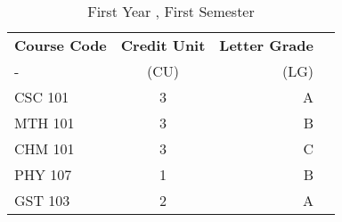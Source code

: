 \documentclass{article}
\begin{document}
	
	\begin{table}[h!]
		\begin{center}
			\caption{First Year , First Semester}
			\label{tab:table1}
			\begin{tabular}{l|c|r|c}
				\textbf{Course Code} & \textbf{Credit Unit} &
				\textbf{Letter Grade}\\
				- & (CU) & (LG) \\
				\hline
				CSC 101 & 3 & A\\
				MTH 101 & 3 & B\\
				CHM 101 & 3 & C\\
				PHY 107 & 1 & B\\
				GST 103 & 2 & A\\
				\end{tabular}
			\end{center}
		\end{table}
	
\end{document}
